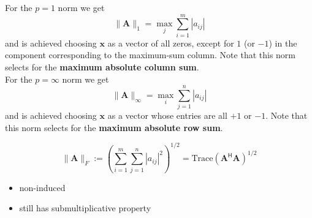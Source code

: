 For the $p = 1$ norm we get
\begin{equation*}
    \|\mathbf{A}\|_1=\max_j\sum_{i=1}^m|a_{ij}|
\end{equation*}
and is achieved choosing $\mathbf{x}$ as a vector of all zeros, except for $1$ (or $-1$) in the component corresponding to the maximum-sum column. Note that this norm selects for the \textbf{maximum absolute column sum}.\\

For the $p = \infty$ norm we get
\begin{equation*}
    \|\mathbf{A}\|_\infty=\max_i\sum_{j=1}^n|a_{ij}|
\end{equation*}
and is achieved choosing $\mathbf{x}$ as a vector whose entries are all $+1$ or $-1$. Note that this norm selects for the \textbf{maximum absolute row sum}.


\begin{equation*}
    \|\mathbf{A}\|_F:={\left(\sum_{i=1}^m\sum_{j=1}^n|a_{ij}|^2\right)}^{1/2}=\text{Trace}{(\mathbf{A}^{\mathsf{H}}\mathbf{A})}^{1/2}
\end{equation*}

\begin{itemize}
    \item non-induced
    \item still has submultiplicative property
\end{itemize}

